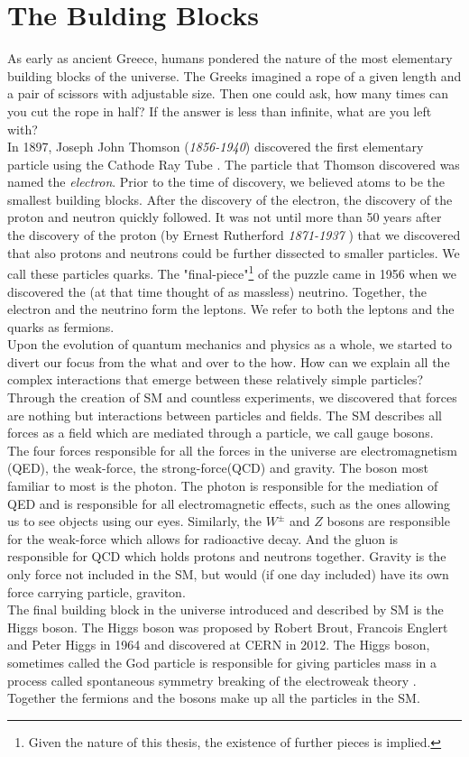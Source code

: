 \section{The Bulding Blocks}
As early as ancient Greece, humans pondered the nature of the most elementary building blocks of
the universe. The Greeks imagined a rope of a given length and a pair of scissors with adjustable size.
Then one could ask, how many times can you cut the rope in half? If the answer is less than infinite,
what are you left with?
\\
In 1897, Joseph John Thomson (\emph{1856-1940}) discovered the first elementary particle using the Cathode Ray Tube \cite{JJ}. 
The particle that Thomson discovered was named the \emph{electron}. Prior to the time of discovery, we believed atoms to 
be the smallest building blocks. After the discovery of the electron, the discovery of the 
proton and neutron quickly followed. It was not until more than 50 years after the discovery of 
the proton (by Ernest Rutherford \emph{1871-1937} \cite{Rutherfoord}) that we discovered that also protons and neutrons could be further
dissected to smaller particles. We call these particles quarks. The "final-piece"\footnote{Given the
nature of this thesis, the existence of further pieces is implied.} of the puzzle came
in 1956 \cite{Reines} when we discovered the (at that time thought of as massless) neutrino. Together, the 
electron and the neutrino form the leptons. We refer to both the leptons and the quarks as fermions.
\\
Upon the evolution of quantum mechanics and physics as a whole, we started to divert
our focus from the what and over to the how. How can we explain all the complex interactions
that emerge between these relatively simple particles? Through the creation of \ac{SM} and countless 
experiments, we discovered that forces are nothing but interactions between particles and fields.
The \ac{SM} describes all forces as a field which are mediated through a particle, we call gauge bosons. 
\\
The four forces responsible for all the forces in the universe are electromagnetism (\ac{QED}), the weak-force, 
the strong-force(\ac{QCD}) and gravity. The boson most familiar to most is the photon. The photon is responsible 
for the mediation of \ac{QED} and is responsible for all electromagnetic effects, such as the ones allowing
us to see objects using our eyes. Similarly, the $W^{\pm}$ and $Z$ bosons are responsible for the weak-force which
allows for radioactive decay. And the gluon is responsible for \ac{QCD} which holds protons and 
neutrons together. Gravity is the only force not included in the SM, but would (if one day included)
have its own force carrying particle, graviton. 
\\
The final building block in the universe introduced and described by \ac{SM} is the Higgs boson.
The Higgs boson was proposed by Robert Brout, Francois Englert and Peter Higgs in 1964 and discovered at CERN in 2012. The Higgs boson,
sometimes called the God particle is responsible for giving particles mass in a process called
spontaneous symmetry breaking of the electroweak theory \cite{SSB}. Together the fermions and the bosons make up all the 
particles in the \ac{SM}.
